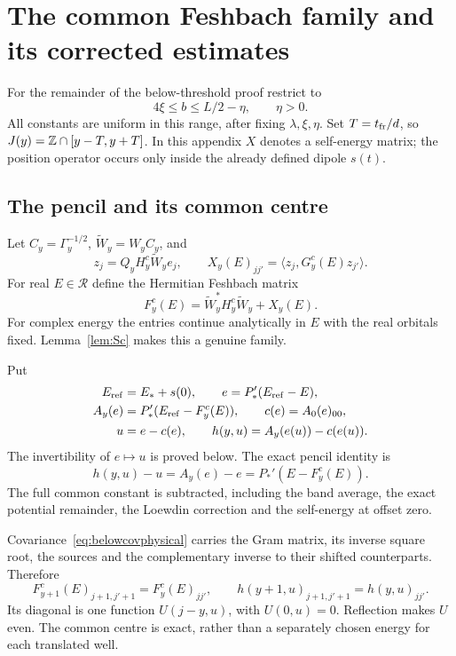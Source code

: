 \section{The common Feshbach family and its corrected estimates}\label{app:below-family}
For the remainder of the below-threshold proof restrict to
\begin{equation}\label{eq:belowregime}
 4\xi\le b\le L/2-\eta,\qquad \eta>0.
\end{equation}
All constants are uniform in this range, after fixing $\lambda,\xi,\eta$.
Set $T=t_{\rm fr}/d$, so $J(y)=\mathbb Z\cap[y-T,y+T]$.
In this appendix $X$ denotes a self-energy matrix; the position operator occurs only inside the already defined dipole $s(t)$.

\subsection{The pencil and its common centre}
Let $C_y=\Gamma_y^{-1/2}$, $\widetilde W_y=W_yC_y$, and
\[
 z_j=Q_yH_y^c\widetilde W_y e_j,\qquad
 X_y(E)_{jj'}=\langle z_j,G_y^c(E)z_{j'}\rangle.
\]
For real $E\in\mathcal R$ define the Hermitian Feshbach matrix
\[
 F_y^c(E)=\widetilde W_y^*H_y^c\widetilde W_y+X_y(E).
\]
For complex energy the entries continue analytically in $E$ with the real orbitals fixed. Lemma~\ref{lem:Sc} makes this a genuine family.

Put
\begin{equation}\label{eq:belowpencil}
\begin{split}
 E_{\rm ref}&=E_*+s(0),\qquad e=P_*'(E_{\rm ref}-E),\\
 A_y(e)&=P_*'(E_{\rm ref}-F_y^c(E)),\qquad c(e)=A_0(e)_{00},\\
 u&=e-c(e),\qquad h(y,u)=A_y(e(u))-c(e(u)).
\end{split}
\end{equation}
The invertibility of $e\mapsto u$ is proved below. The exact pencil identity is
\begin{equation}\label{eq:belowpencilidentity}
 h(y,u)-u=A_y(e)-e=P_*'(E-F_y^c(E)).
\end{equation}
The full common constant is subtracted, including the band average, the exact potential remainder, the Loewdin correction and the self-energy at offset zero.

Covariance~\eqref{eq:belowcovphysical} carries the Gram matrix, its inverse square root, the sources and the complementary inverse to their shifted counterparts. Therefore
\begin{equation}\label{eq:belowcov}
 F_{y+1}^c(E)_{j+1,j'+1}=F_y^c(E)_{jj'},\qquad
 h(y+1,u)_{j+1,j'+1}=h(y,u)_{jj'}.
\end{equation}
Its diagonal is one function $U(j-y,u)$, with $U(0,u)=0$. Reflection makes $U$ even. The common centre is exact, rather than a separately chosen energy for each translated well.

